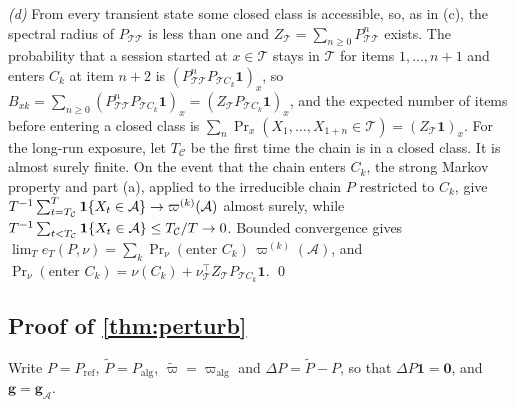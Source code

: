 \emph{(d)} From every transient state some closed class is accessible, so, as in (c), the spectral radius of $P_{\mathcal T\mathcal T}$ is less than one and $Z_{\mathcal T}=\sum_{n\ge0}P_{\mathcal T\mathcal T}^n$ exists. The probability that a session started at $x\in\mathcal T$ stays in $\mathcal T$ for items $1,\dots,n+1$ and enters $C_k$ at item $n+2$ is $(P_{\mathcal T\mathcal T}^nP_{\mathcal TC_k}\bm1)_x$, so $B_{xk}=\sum_{n\ge0}(P_{\mathcal T\mathcal T}^nP_{\mathcal TC_k}\bm1)_x=(Z_{\mathcal T}P_{\mathcal TC_k}\bm1)_x$, and the expected number of items before entering a closed class is $\sum_n\Pr_x(X_1,\dots,X_{1+n}\in\mathcal T)=(Z_{\mathcal T}\bm1)_x$. For the long-run exposure, let $T_{\mathcal C}$ be the first time the chain is in a closed class. It is almost surely finite. On the event that the chain enters $C_k$, the strong Markov property and part (a), applied to the irreducible chain $P$ restricted to $C_k$, give $T^{-1}\sum_{t=T_{\mathcal C}}^{T}\mathbf{1}\!\left\{X_t\in\mathcal A\right\}\to\varpi^{(k)}(\mathcal A)$ almost surely, while $T^{-1}\sum_{t<T_{\mathcal C}}\mathbf{1}\!\left\{X_t\in\mathcal A\right\}\le T_{\mathcal C}/T\to0$. Bounded convergence gives $\lim_Te_T(P,\nu)=\sum_k\Pr_\nu(\text{enter }C_k)\,\varpi^{(k)}(\mathcal A)$, and $\Pr_\nu(\text{enter }C_k)=\nu(C_k)+\nu_{\mathcal T}^{\top}Z_{\mathcal T}P_{\mathcal TC_k}\bm1$. \qed

\subsection{Proof of \texorpdfstring{\cref{thm:perturb}}{the sensitivity theorem}}\label{app:pf-perturb}

Write $P=P_{\mathrm{ref}}$, $\tilde P=P_{\mathrm{alg}}$, $\tilde\varpi=\varpi_{\mathrm{alg}}$ and $\Delta P=\tilde P-P$, so that $\Delta P\bm1=\bm0$, and $\bm g=\bm g_{\mathcal A}$.

